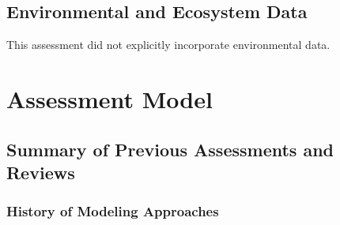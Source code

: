 \documentclass[11pt,
  english,
  a4paper,
]{article}
\begin{document}
\leavevmode\tagmcend\tagstructend\par


\hypertarget{environmental-and-ecosystem-data}{%
\subsection{Environmental and Ecosystem Data}\label{environmental-and-ecosystem-data}}

\leavevmode\tagmcend\tagstructend


This assessment did not explicitly incorporate environmental data.

\leavevmode\tagmcend\tagstructend\par


\hypertarget{assessment-model}{%
\section{Assessment Model}\label{assessment-model}}

\leavevmode\tagmcend\tagstructend


\hypertarget{summary-of-previous-assessments-and-reviews}{%
\subsection{Summary of Previous Assessments and Reviews}\label{summary-of-previous-assessments-and-reviews}}

\leavevmode\tagmcend\tagstructend


\hypertarget{history-of-modeling-approaches}{%
\subsubsection{History of Modeling Approaches}\label{history-of-modeling-approaches}}

\leavevmode\tagmcend\tagstructend

\end{document}
